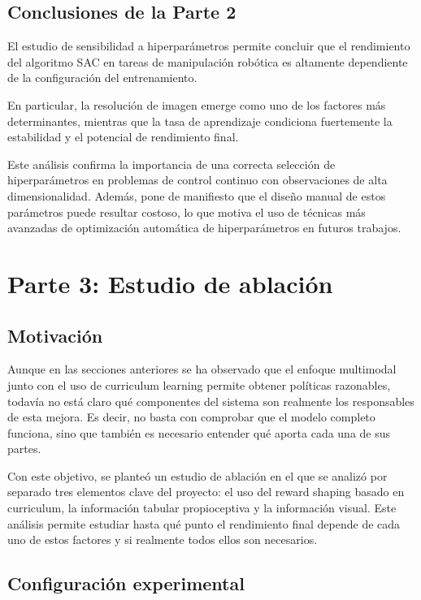 \documentclass[10pt,twocolumn]{article}
\begin{document}
\subsection{Conclusiones de la Parte 2}

El estudio de sensibilidad a hiperparámetros permite concluir que el rendimiento del algoritmo SAC en tareas de manipulación robótica es altamente dependiente de la configuración del entrenamiento.

En particular, la resolución de imagen emerge como uno de los factores más determinantes, mientras que la tasa de aprendizaje condiciona fuertemente la estabilidad y el potencial de rendimiento final.

Este análisis confirma la importancia de una correcta selección de hiperparámetros en problemas de control continuo con observaciones de alta dimensionalidad. Además, pone de manifiesto que el diseño manual de estos parámetros puede resultar costoso, lo que motiva el uso de técnicas más avanzadas de optimización automática de hiperparámetros en futuros trabajos.

\section{Parte 3: Estudio de ablación}

\subsection{Motivación}

Aunque en las secciones anteriores se ha observado que el enfoque multimodal junto con el uso de curriculum learning permite obtener políticas razonables, todavía no está claro qué componentes del sistema son realmente los responsables de esta mejora. Es decir, no basta con comprobar que el modelo completo funciona, sino que también es necesario entender qué aporta cada una de sus partes.

Con este objetivo, se planteó un estudio de ablación en el que se analizó por separado tres elementos clave del proyecto: el uso del reward shaping basado en curriculum, la información tabular propioceptiva y la información visual. Este análisis permite estudiar hasta qué punto el rendimiento final depende de cada uno de estos factores y si realmente todos ellos son necesarios.

\subsection{Configuración experimental}
\end{document}
